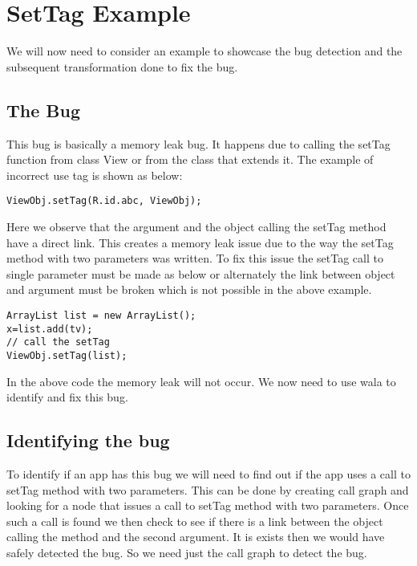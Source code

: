 \documentclass[11pt,psfig,a4]{article}
\begin{document}
\section{SetTag Example}
\begin{flushleft}
We will now need to consider an example to showcase the bug detection and the subsequent transformation done to fix the bug.\\
\subsection{The Bug}
This bug is basically a memory leak bug. It happens due to calling the setTag function from class View or from the class that extends it. The example of incorrect use tag is shown as below:\\
\begin{lstlisting}
ViewObj.setTag(R.id.abc, ViewObj);
\end{lstlisting}
Here we observe that the argument and the object calling the setTag method have a direct link. This creates a memory leak issue due to the way the setTag method with two parameters was written. To fix this issue the setTag call to single parameter must be made as below or alternately the link between object and argument must be broken which is not possible in the above example.\\
\begin{lstlisting}
ArrayList list = new ArrayList();
x=list.add(tv);
// call the setTag
ViewObj.setTag(list);
\end{lstlisting}
In the above code the memory leak will not occur. We now need to use wala to identify and fix this bug.\\
\subsection{Identifying the bug}
To identify if an app has this bug we will need to find out if the app uses a call to setTag method with two parameters. This can be done by creating call graph and looking for a node that issues a call to setTag method with two parameters. Once such a call is found we then check to see if there is a link between the object calling the method and the second argument. It is exists then we would have safely detected the bug. So we need just the call graph to detect the bug.\\

\end{flushleft}
\end{document}
